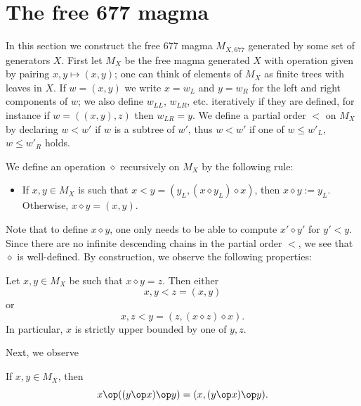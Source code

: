 \section{The free 677 magma}

In this section we construct the free 677 magma $M_{X,677}$ generated by some set of generators $X$.  First let $M_X$ be the free magma generated $X$ with operation given by pairing $x,y \mapsto (x,y)$; one can think of elements of $M_X$ as finite trees with leaves in $X$.  If $w = (x,y)$ we write $x = w_L$ and $y = w_R$ for the left and right components of $w$; we also define $w_{LL}$, $w_{LR}$, etc. iteratively if they are defined, for instance if $w = ((x,y),z)$ then $w_{LR} = y$.  We define a partial order $<$ on $M_X$ by declaring $w < w'$ if $w$ is a subtree of $w'$, thus $w < w'$ if one of $w \leq w'_L$, $w \leq w'_R$ holds.

We define an operation $\diamond$ recursively on $M_X$ by the following rule:
\begin{itemize}
\item If $x,y \in M_X$ is such that $x < y = (y_L, (x \diamond y_L) \diamond x)$, then $x \diamond y := y_L$.  Otherwise, $x \diamond y = (x,y)$.
\end{itemize}

Note that to define $x \diamond y$, one only needs to be able to compute $x' \diamond y'$ for $y' < y$.  Since there are no infinite descending chains in the partial order $<$, we see that $\diamond$ is well-defined.  By construction, we observe the following properties:

\begin{lemma}\label{op-prop}  Let $x,y \in M_X$ be such that $x \diamond y = z$.  Then either
$$ x, y < z = (x,y)$$
or
$$ x, z < y = (z, (x \diamond z) \diamond x).$$
In particular, $x$ is strictly upper bounded by one of $y,z$.
\end{lemma}

Next, we observe

\begin{lemma}\label{op-2-677}  If $x,y \in M_X$, then
  $$ x \op ((y \op x) \op y) = (x, (y \op x) \op y).$$
\end{lemma}

